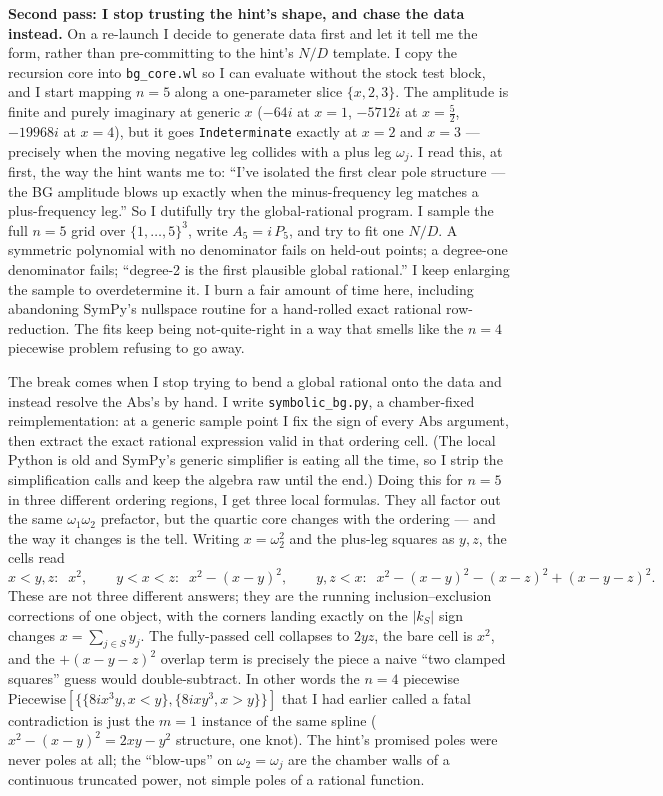 \documentclass{article}
\begin{document}
\medskip
\noindent\textbf{Second pass: I stop trusting the hint's shape, and chase the
data instead.}\quad
On a re-launch I decide to generate data first and let it tell me the form,
rather than pre-committing to the hint's $N/D$ template. I copy the recursion
core into \texttt{bg\_core.wl} so I can evaluate without the stock test block, and
I start mapping $n=5$ along a one-parameter slice $\{x,2,3\}$. The amplitude is
finite and purely imaginary at generic $x$ ($-64i$ at $x=1$,
$-5712i$ at $x=\tfrac52$, $-19968i$ at $x=4$), but it goes \texttt{Indeterminate}
exactly at $x=2$ and $x=3$ --- precisely when the moving negative leg collides
with a plus leg $\omega_j$. I read this, at first, the way the hint wants me to:
``I've isolated the first clear pole structure --- the BG amplitude blows up
exactly when the minus-frequency leg matches a plus-frequency leg.'' So I dutifully
try the global-rational program. I sample the full $n=5$ grid over
$\{1,\dots,5\}^3$, write $A_5=i\,P_5$, and try to fit one $N/D$. A symmetric
polynomial with no denominator fails on held-out points; a degree-one denominator
fails; ``degree-2 is the first plausible global rational.'' I keep enlarging the
sample to overdetermine it. I burn a fair amount of time here, including
abandoning SymPy's nullspace routine for a hand-rolled exact rational
row-reduction. The fits keep being not-quite-right in a way that smells like the
$n=4$ piecewise problem refusing to go away.

The break comes when I stop trying to bend a global rational onto the data and
instead resolve the $\mathrm{Abs}$'s by hand. I write \texttt{symbolic\_bg.py}, a
chamber-fixed reimplementation: at a generic sample point I fix the sign of every
$\mathrm{Abs}$ argument, then extract the exact rational expression valid in that
ordering cell. (The local Python is old and SymPy's generic simplifier is eating
all the time, so I strip the simplification calls and keep the algebra raw until
the end.) Doing this for $n=5$ in three different ordering regions, I get three
local formulas. They all factor out the same $\omega_1\omega_2$ prefactor, but the
quartic core changes with the ordering --- and the way it changes is the tell.
Writing $x=\omega_2^2$ and the plus-leg squares as $y,z$, the cells read
\[
x<y,z:\;\; x^{2},\qquad
y<x<z:\;\; x^{2}-(x-y)^{2},\qquad
y,z<x:\;\; x^{2}-(x-y)^{2}-(x-z)^{2}+(x-y-z)^{2}.
\]
These are not three different answers; they are the running
inclusion--exclusion corrections of one object, with the corners landing exactly
on the $|k_S|$ sign changes $x=\sum_{j\in S}y_j$. The fully-passed cell collapses
to $2yz$, the bare cell is $x^2$, and the $+(x-y-z)^2$ overlap term is precisely
the piece a naive ``two clamped squares'' guess would double-subtract. In other
words the $n=4$ piecewise $\mathrm{Piecewise}[\{\{8ix^3y,x<y\},\{8ixy^3,x>y\}\}]$
that I had earlier called a fatal contradiction is just the $m=1$ instance of the
same spline ($x^2-(x-y)^2=2xy-y^2$ structure, one knot). The hint's promised poles
were never poles at all; the ``blow-ups'' on $\omega_2=\omega_j$ are the chamber
walls of a continuous truncated power, not simple poles of a rational function.
\end{document}
